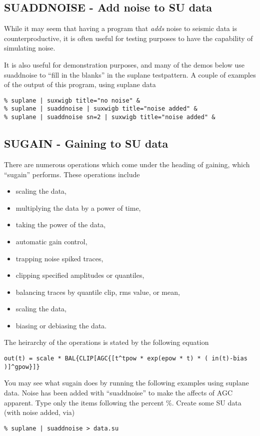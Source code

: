 {{{{{{{\subsection{SUADDNOISE - Add noise to SU data}

While it may seem that having a program that {\em adds\/} noise
to seismic data is counterproductive, it is often useful
for testing purposes to have the capability of simulating
noise.

It is also useful for demonstration purposes, and many of the
demos below use suaddnoise to ``fill in the blanks'' in the
suplane testpattern. A couple of examples of the output of this
program, using suplane data

{\small\begin{verbatim}
% suplane | suxwigb title="no noise" &
% suplane | suaddnoise | suxwigb title="noise added" &
% suplane | suaddnoise sn=2 | suxwigb title="noise added" &
\end{verbatim}}\noindent

\subsection{SUGAIN - Gaining to SU data}

There are numerous operations which come under the heading of
gaining, which ``sugain'' performs.
These operations include
\begin{itemize}
\item scaling the data,
\item multiplying the data by a power of time,
\item taking the power of the data,
\item automatic gain control,
\item trapping noise spiked traces,
\item clipping specified amplitudes or  quantiles,
\item balancing traces by quantile clip, rms value, or mean,
\item scaling the data,
\item biasing or debiasing the data.
\end{itemize}
The heirarchy of the operations is stated by the following equation
{\small\begin{verbatim}
out(t) = scale * BAL{CLIP[AGC{[t^tpow * exp(epow * t) * ( in(t)-bias )]^gpow}]}
\end{verbatim}}\noindent

You may see what sugain does by running the following examples
using suplane data. Noise has been added with ``suaddnoise'' to
make the affects of AGC apparent. 
Type only the items following the percent \%.
Create some SU data (with noise added, via)
{\small\begin{verbatim}
% suplane | suaddnoise > data.su
\end{verbatim}}\noindent

}}}}}}}
